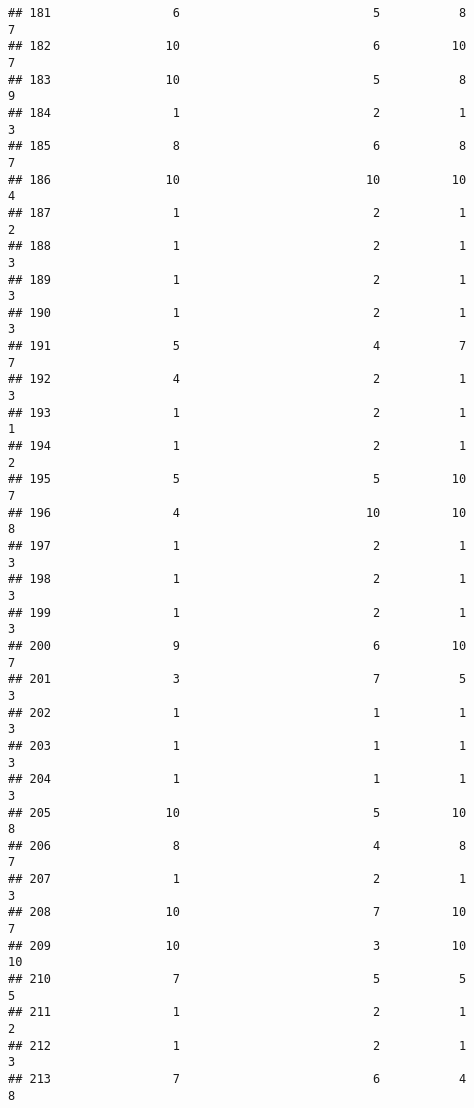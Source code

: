 \documentclass[
]{article}
\begin{document}
\begin{verbatim}
## 181                 6                           5           8               7
## 182                10                           6          10               7
## 183                10                           5           8               9
## 184                 1                           2           1               3
## 185                 8                           6           8               7
## 186                10                          10          10               4
## 187                 1                           2           1               2
## 188                 1                           2           1               3
## 189                 1                           2           1               3
## 190                 1                           2           1               3
## 191                 5                           4           7               7
## 192                 4                           2           1               3
## 193                 1                           2           1               1
## 194                 1                           2           1               2
## 195                 5                           5          10               7
## 196                 4                          10          10               8
## 197                 1                           2           1               3
## 198                 1                           2           1               3
## 199                 1                           2           1               3
## 200                 9                           6          10               7
## 201                 3                           7           5               3
## 202                 1                           1           1               3
## 203                 1                           1           1               3
## 204                 1                           1           1               3
## 205                10                           5          10               8
## 206                 8                           4           8               7
## 207                 1                           2           1               3
## 208                10                           7          10               7
## 209                10                           3          10              10
## 210                 7                           5           5               5
## 211                 1                           2           1               2
## 212                 1                           2           1               3
## 213                 7                           6           4               8

\end{verbatim}
\end{document}
